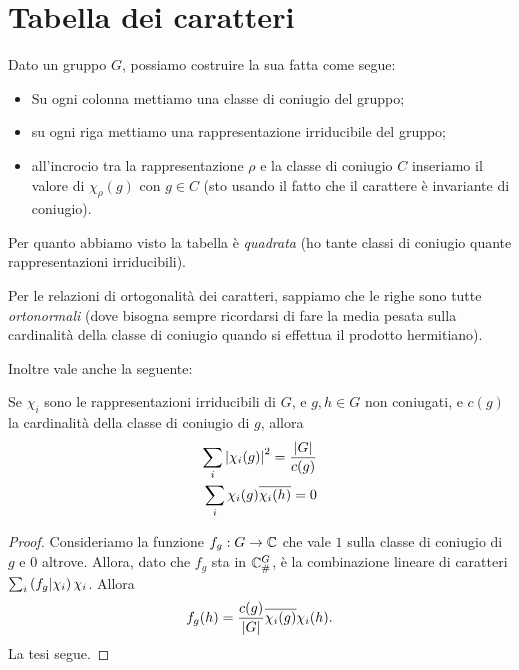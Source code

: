 \section{Tabella dei caratteri}

Dato un gruppo $G$, possiamo costruire la sua  fatta come segue:
\begin{itemize}
  \item Su ogni colonna mettiamo una classe di coniugio del gruppo;
  \item su ogni riga mettiamo una rappresentazione irriducibile del gruppo;
  \item all'incrocio tra la rappresentazione $\rho$ e la classe di coniugio $C$ inseriamo il valore di $\chi_\rho(g)$ con $g\in C$ (sto usando il fatto che il carattere è invariante di coniugio).
\end{itemize}

Per quanto abbiamo visto la tabella è \emph{quadrata} (ho tante classi di coniugio quante rappresentazioni irriducibili).

Per le relazioni di ortogonalità dei caratteri, sappiamo che le righe sono tutte \emph{ortonormali} (dove bisogna sempre ricordarsi di fare la media pesata sulla cardinalità della classe di coniugio quando si effettua il prodotto hermitiano).

Inoltre vale anche la seguente:
\begin{myprop}
  Se $\chi_i$ sono le rappresentazioni irriducibili di $G$, e $g,h\in G$ non coniugati, e $c(g)$ la cardinalità della classe di coniugio di $g$, allora 
  \begin{align*}
    \sum_i \left|\chi_i(g)\right|^2 = \frac {\left|G\right|}{c(g)}\\
    \sum_i \chi_i(g)\overline{\chi_i(h)} = 0
  \end{align*}
\end{myprop}

\begin{proof}
	Consideriamo la funzione $f_g: G \rightarrow \mathbb C$ che vale $1$ sulla classe di coniugio di $g$ e $0$ altrove.
	Allora, dato che $f_g$ sta in $\mathbb C^{G}_\#$, è la combinazione lineare di caratteri $\sum_i \left(f_g | \chi_i\right)\chi_i$. Allora
	\[
			f_g(h) = \frac{c(g)}{\left|G\right|}\overline{\chi_i(g)}\chi_i(h).
	\]
	La tesi segue.
\end{proof}


